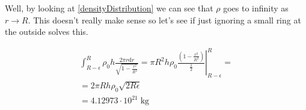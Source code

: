 \begin{solution}

Well, by looking at \eqref{densityDistribution} we can see that 
$\rho$ goes to infinity as $r \rightarrow R$. This doesn't really make 
sense so let's see if just ignoring a small ring at the outside solves 
this. 

\begin{gather*}
    \int^{R}_{R - \epsilon} \rho_0 h \frac{2\pi r \mathrm{d} r}{
    \sqrt{1 - \frac{r ^ 2}{R ^ 2}}} = \pi R ^ 2 h \rho_0 \left.\frac{\left( 1
        - \frac{r^2}{R^2} \right)}{\frac{1}{2}}\right|^R_{R - \epsilon} = \\
     = 2 \pi R h \rho_0 \sqrt{2 R \epsilon} \\
     = 4.12973 \cdot 10 ^ {21} \; \mathrm{kg}
\end{gather*}

\end{solution}